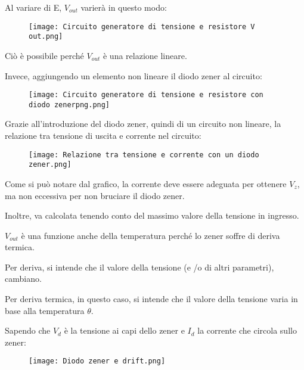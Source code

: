 Al variare di E, $V_{out}$ varierà in questo modo: 

\begin{figure}[h]
    \centering
    \texttt{[image: Circuito generatore di tensione e resistore V out.png]}
\end{figure}

Ciò è possibile perché $V_{out}$ è una relazione lineare. \newline

Invece, aggiungendo un elemento non lineare il diodo zener al circuito: 

\begin{figure}[h]
    \centering
    \texttt{[image: Circuito generatore di tensione e resistore con diodo zenerpng.png]}
\end{figure}

Grazie all'introduzione del diodo zener, quindi di un circuito non lineare, 
la relazione tra tensione di uscita e corrente nel circuito: 

\begin{figure}[h]
    \centering
    \texttt{[image: Relazione tra tensione e corrente con un diodo zener.png]}
\end{figure}

Come si può notare dal grafico, 
la corrente deve essere adeguata per ottenere $V_z$, 
ma non eccessiva per non bruciare il diodo zener. \newline 

Inoltre, va calcolata tenendo conto del massimo valore della tensione in ingresso. \newline 

$V_{out}$ è una funzione anche della temperatura perché lo zener soffre di deriva termica. \newline 

Per deriva, si intende che il valore della tensione (e /o di altri parametri), 
cambiano. \newline 

Per deriva termica, in questo caso, si intende che il valore della tensione varia in base alla temperatura $\theta$. \newline 

Sapendo che $V_d$ è la tensione ai capi dello zener e $I_d$ la corrente che circola sullo zener: 

\begin{figure}[h]
    \centering
    \texttt{[image: Diodo zener e drift.png]}
\end{figure}

